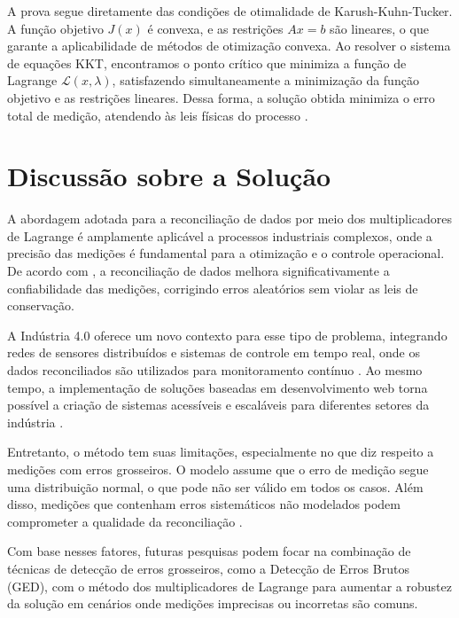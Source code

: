 \begin{prova}
A prova segue diretamente das condições de otimalidade de Karush-Kuhn-Tucker. A função objetivo $J(x)$ é convexa, e as restrições $Ax = b$ são lineares, o que garante a aplicabilidade de métodos de otimização convexa. Ao resolver o sistema de equações KKT, encontramos o ponto crítico que minimiza a função de Lagrange $\mathcal{L}(x, \lambda)$, satisfazendo simultaneamente a minimização da função objetivo e as restrições lineares. Dessa forma, a solução obtida minimiza o erro total de medição, atendendo às leis físicas do processo \cite{kktproof}.
\end{prova}

\section{Discussão sobre a Solução}
\label{Sec:DiscussaoSolucao}

A abordagem adotada para a reconciliação de dados por meio dos multiplicadores de Lagrange é amplamente aplicável a processos industriais complexos, onde a precisão das medições é fundamental para a otimização e o controle operacional. De acordo com \cite{reconcilationindustrial}, a reconciliação de dados melhora significativamente a confiabilidade das medições, corrigindo erros aleatórios sem violar as leis de conservação.

A Indústria 4.0 oferece um novo contexto para esse tipo de problema, integrando redes de sensores distribuídos e sistemas de controle em tempo real, onde os dados reconciliados são utilizados para monitoramento contínuo \cite{cyberphysicalsystems}. Ao mesmo tempo, a implementação de soluções baseadas em desenvolvimento web torna possível a criação de sistemas acessíveis e escaláveis para diferentes setores da indústria \cite{websolutions}.

Entretanto, o método tem suas limitações, especialmente no que diz respeito a medições com erros grosseiros. O modelo assume que o erro de medição segue uma distribuição normal, o que pode não ser válido em todos os casos. Além disso, medições que contenham erros sistemáticos não modelados podem comprometer a qualidade da reconciliação \cite{dataerrorsystems}.

Com base nesses fatores, futuras pesquisas podem focar na combinação de técnicas de detecção de erros grosseiros, como a Detecção de Erros Brutos (GED), com o método dos multiplicadores de Lagrange para aumentar a robustez da solução em cenários onde medições imprecisas ou incorretas são comuns.
